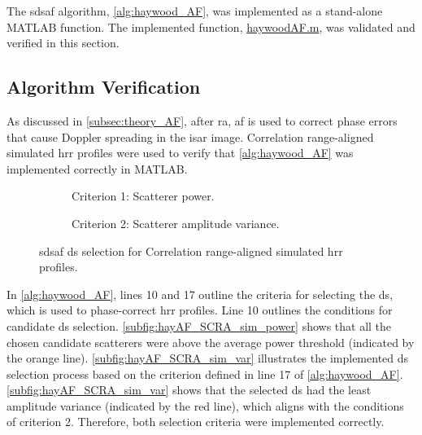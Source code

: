 \documentclass[class=report,11pt,crop=false]{standalone}
\begin{document}
    The \gls{sdsaf} algorithm, \autoref{alg:haywood_AF}, was implemented as a stand-alone \textsc{MATLAB} function. The implemented function, \href{}{haywoodAF.m}, was validated and verified in this section.
    
    \subsection{Algorithm Verification}
    As discussed in \autoref{subsec:theory_AF}, after \gls{ra}, \gls{af} is used to correct phase errors that cause Doppler spreading in the \gls{isar} image. Correlation range-aligned simulated \gls{hrr} profiles were used to verify that \autoref{alg:haywood_AF} was implemented correctly in \textsc{MATLAB}.

    \begin{figure}[H]
        \centering
        \begin{subfigure}{0.45\linewidth}
            \resizebox{\linewidth}{!}{}
            \caption{Criterion 1: Scatterer power.} \label{subfig:hayAF_SCRA_sim_power}
        \end{subfigure}
        \hspace{1cm}
        \begin{subfigure}{0.45\linewidth}
            \resizebox{\linewidth}{!}{}
            \caption{Criterion 2: Scatterer amplitude variance.} \label{subfig:hayAF_SCRA_sim_var}
        \end{subfigure}
        \caption{\gls{sdsaf} \gls{ds} selection for Correlation range-aligned simulated \gls{hrr} profiles.\label{subfig:hayAF_SCRA_sim_power&var}}
    \end{figure}

    In \autoref{alg:haywood_AF}, lines 10 and 17 outline the criteria for selecting the \gls{ds}, which is used to phase-correct \gls{hrr} profiles. Line 10 outlines the conditions for candidate \gls{ds} selection. \autoref{subfig:hayAF_SCRA_sim_power} shows that all the chosen candidate scatterers were above the average power threshold (indicated by the orange line). \autoref{subfig:hayAF_SCRA_sim_var} illustrates the implemented \gls{ds} selection process based on the criterion defined in line 17 of \autoref{alg:haywood_AF}. \autoref{subfig:hayAF_SCRA_sim_var} shows that the selected \gls{ds} had the least amplitude variance (indicated by the red line), which aligns with the conditions of criterion 2. Therefore, both selection criteria were implemented correctly.
    
\end{document}
